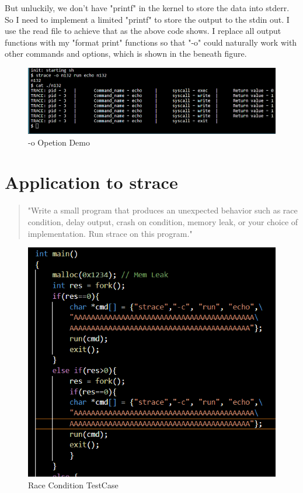 \documentclass[11pt,oneside,a4paper]{article}
\begin{document}
But unluckily, we don't have "printf" in the kernel to store the data into stderr.
So I need to implement a limited "printf" to store the output to the stdin out. 
I use the read file to achieve that as the above code shows. I replace all output functions
with my "format print" functions so that "-o" could naturally work with other 
commands and options, which is shown in the beneath figure.

\begin{figure}[H]
    \includegraphics[width=4.75in]{1-35.png}
    \centering
    \caption{-o Opetion Demo}
\end{figure}

\section{Application to strace}

\begin{quotation}
    "Write a small program that produces an unexpected behavior such as race condition, delay output, crash
    on condition, memory leak, or your choice of implementation. Run strace on this program."
\end{quotation}

\begin{figure}[H]
    \includegraphics[width=4.75in]{1-40.png}
    \centering
    \caption{Race Condition TestCase}
\end{figure}
\end{document}
